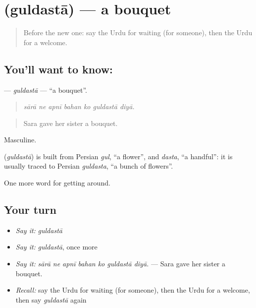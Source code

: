 \section[\texorpdfstring{\ur{گلدستہ} (guldastā)}{گلدستہ (guldastā)}]{ (guldastā) — a bouquet}

\label{lesson:UR-C401-guldasta}



\begin{quote}
Before the new one: say the Urdu for waiting (for someone), then the Urdu for a welcome.
\end{quote}

\subsection*{You'll want to know: }
\textbf{} — \emph{guldastā} — \textquotedblleft{}a bouquet\textquotedblright{}.

\begin{quote}
      
\end{quote}

\begin{quote}
\emph{sārā ne apnī bahan ko guldastā diyā.}
\end{quote}

\begin{quote}
Sara gave her sister a bouquet.
\end{quote}

Masculine.

\begin{cousinweb}
\textbf{} (\emph{guldastā}) is built from Persian \emph{gul}, \textquotedblleft{}a flower\textquotedblright{}, and \emph{dasta}, \textquotedblleft{}a handful\textquotedblright{}: it is usually traced to Persian \emph{guldasta}, \textquotedblleft{}a bunch of flowers\textquotedblright{}.
\end{cousinweb}

\begin{grammarlens}[title={What you've built}]
One more word for getting around.
\end{grammarlens}

\subsection*{Your turn}
\begin{itemize}
\raggedright
  \item \emph{Say it:} \emph{guldastā}
  \item \emph{Say it:} \emph{guldastā}, once more
  \item \emph{Say it:} \emph{sārā ne apnī bahan ko guldastā diyā.} — Sara gave her sister a bouquet.
  \item \emph{Recall:} say the Urdu for waiting (for someone), then the Urdu for a welcome, then say \emph{guldastā} again
\end{itemize}

